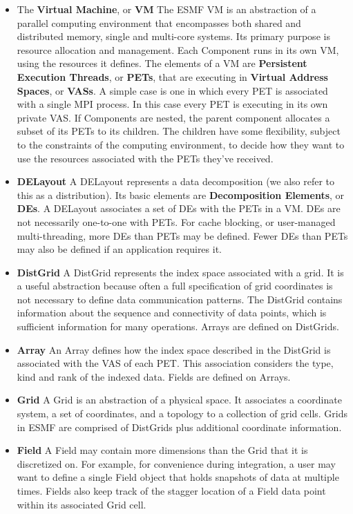 \begin{itemize}

\item The {\bf Virtual Machine}, or {\bf VM} The ESMF VM is an 
abstraction of a parallel computing environment that encompasses 
both shared and distributed memory, single and multi-core systems.
Its primary purpose is resource allocation and management. Each Component
runs in its own VM, using the resources it defines. The elements of a VM
are {\bf Persistent Execution Threads}, or {\bf PETs}, that are
executing in {\bf Virtual Address Spaces}, or {\bf VASs}. A simple
case is one in which every PET is associated with a single MPI process.
In this case every PET is executing in its own private VAS. If Components
are nested, the parent component allocates a subset of its PETs to its
children. The children have some flexibility, subject to the constraints of
the computing environment, to decide how they want to use the
resources associated with the PETs they've received.

\item {\bf DELayout}  A DELayout represents a data decomposition
(we also refer to this as a distribution).  Its
basic elements are {\bf Decomposition Elements}, or {\bf DEs}.  
A DELayout associates a set of DEs with the PETs in a VM.  DEs are not
necessarily one-to-one with PETs.  For cache blocking,
or user-managed multi-threading, more DEs than PETs may be defined.
Fewer DEs than PETs may also be defined if an application requires it.

\item {\bf DistGrid}  A DistGrid represents the index space
associated with a grid.  It is a useful abstraction because
often a full specification of grid coordinates is not necessary
to define data communication patterns.  The DistGrid contains
information about the sequence and connectivity of data points,
which is sufficient information for many operations.  Arrays
are defined on DistGrids.

\item {\bf Array} An Array defines how the index space described
in the DistGrid is associated with the VAS of each PET. This association
considers the type, kind and rank of the indexed data. Fields are
defined on Arrays.

\item {\bf Grid}  A Grid is an abstraction of a physical space.  
It associates a coordinate system, a set of coordinates, and 
a topology to a collection of grid cells.  Grids in ESMF are
comprised of DistGrids plus additional coordinate information. 

\item {\bf Field}  A Field may contain more dimensions than the 
Grid that it is discretized on.  For example, for convenience 
during integration, a user may want to define a single Field object 
that holds snapshots of data at multiple times.  Fields also 
keep track of the stagger location of a Field data point within its 
associated Grid cell.

\end{itemize}


